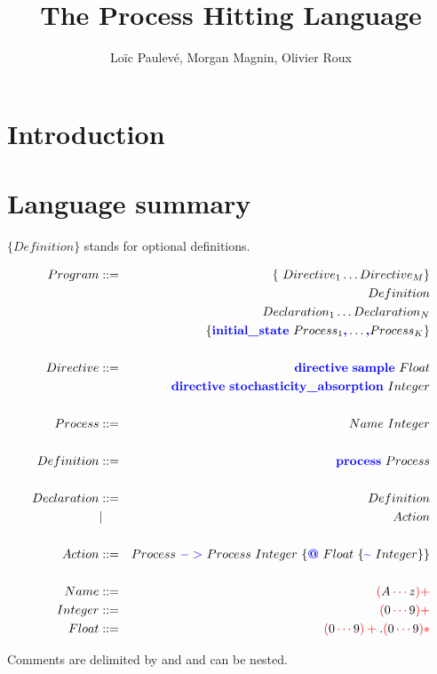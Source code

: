 \documentclass[11pt]{article}
\title{The Process Hitting Language}
\author{Lo\"ic Paulev\'e, Morgan Magnin, Olivier Roux}
\newcommand{\term}[1]{\text{\color{blue}\textbf{#1}}}
\newcommand{\regexp}[1]{{\color{red}#1}}
\newcommand{\ch}[1]{{\color{black}#1}}
\begin{document}
\maketitle

\section{Introduction}

\newpage
\section{Language summary}

$\{ Definition \}$ stands for optional definitions.

\begin{eqnarray*}
Program &::=& \{ Directive_1 \dots Directive_M \}\\
&& Definition \\
&& Declaration_1 \dots Declaration_N\\
&& \{ \term{initial\_state}~Process_1\term{,}\dots\term{,} Process_K \}\\
\\
Directive &::=& \term{directive}~\term{sample}~Float \\
&& \term{directive}~\term{stochasticity\_absorption}~Integer\\
\\
Process &::=& Name~Integer\\
\\
Definition &::=& \term{process}~Process\\
\\
Declaration &::=& Definition \\
& | & Action\\
\\
Action &::=& Process~\term{$->$}~Process~Integer~\{\term{@}~Float~\{\term{\textasciitilde}~Integer\}\}\\
\\
Name & ::= & \regexp{(\ch{A}\cdots \ch{z})+}\\
Integer & ::= & \regexp{(\ch{0}\cdots \ch{9})+}\\
Float & ::= & \regexp{(\ch{0}\cdots \ch{9})+ \ch{.} (\ch{0}\cdots \ch{9})*}\\
\end{eqnarray*}

Comments are delimited by \term{(*} and \term{*)} and can be nested.
\end{document}
